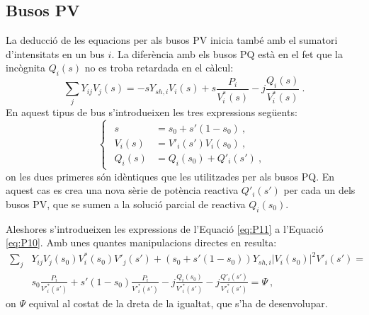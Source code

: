 \subsection{Busos PV}
La deducció de les equacions per als busos PV inicia també amb el sumatori d'intensitats en un bus $i$. La diferència amb els busos PQ està en el fet que la incògnita $Q_i(s)$ no es troba retardada en el càlcul:
\begin{equation}
    \sum_j Y_{ij}V_j(s)=-sY_{sh,i}V_i(s)+s\frac{P_i}{V^*_i(s)}-j\frac{Q_i(s)}{V^*_i(s)}\ .
        \label{eq:P10}
\end{equation}
En aquest tipus de bus s'introdueixen les tres expressions següents:
\begin{equation}
    \begin{cases}
    \begin{split}
    s&=s_0+s'(1-s_0)\ ,\\
    V_i(s)&=V'_i(s')V_i(s_0)\ ,\\
    Q_i(s)&=Q_i(s_0)+Q'_i(s')\ ,
    \end{split}
\end{cases}
        \label{eq:P11}
\end{equation}
on les dues primeres són idèntiques que les utilitzades per als busos PQ. En aquest cas es crea una nova sèrie de potència reactiva $Q'_i(s')$ per cada un dels busos PV, que se sumen a la solució parcial de reactiva $Q_i(s_0)$. 

Aleshores s'introdueixen les expressions de l'Equació \ref{eq:P11} a l'Equació \ref{eq:P10}. Amb unes quantes manipulacions directes en resulta:
\begin{equation}
    \begin{split}
    \sum_j &Y_{ij}V_j(s_0)V^*_i(s_0)V'_j(s')+(s_0+s'(1-s_0))Y_{sh,i}|V_i(s_0)|^2V'_i(s')=\\
    &s_0\frac{P_i}{V'^{*}_i(s')}
    +s'(1-s_0)\frac{P_i}{V'^{*}_i(s')} -j\frac{Q_i(s_0)}{V'^{*}_i(s')}-j\frac{Q'_i(s')}{V'^{*}_i(s')}=\Psi\ , 
\end{split}
        \label{eq:P12}
\end{equation}
on $\Psi$ equival al costat de la dreta de la igualtat, que s'ha de desenvolupar. 

